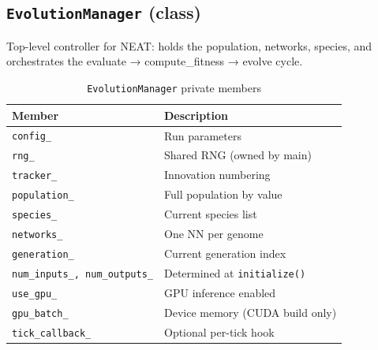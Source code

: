 \subsection{\texttt{EvolutionManager} (class)}

Top-level controller for NEAT: holds the population, networks, species, and orchestrates
the evaluate → compute\_fitness → evolve cycle.

\begin{table}[H]
\centering\small
\caption{\texttt{EvolutionManager} private members}
\begin{tabularx}{\textwidth}{@{}lX@{}}
\toprule
\textbf{Member} & \textbf{Description} \\
\midrule
\texttt{config\_}     & Run parameters \\
\texttt{rng\_}        & Shared RNG (owned by main) \\
\texttt{tracker\_}    & Innovation numbering \\
\texttt{population\_} & Full population by value \\
\texttt{species\_}    & Current species list \\
\texttt{networks\_}   & One NN per genome \\
\texttt{generation\_} & Current generation index \\
\texttt{num\_inputs\_, num\_outputs\_} & Determined at \texttt{initialize()} \\
\texttt{use\_gpu\_}   & GPU inference enabled \\
\texttt{gpu\_batch\_} & Device memory (CUDA build only) \\
\texttt{tick\_callback\_} & Optional per-tick hook \\
\bottomrule
\end{tabularx}
\end{table}

